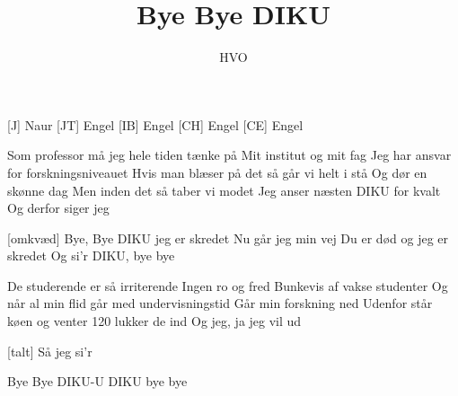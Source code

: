 \documentclass[a4paper,11pt]{article}
\title{Bye Bye DIKU}
\author{HVO}
\begin{document}
\maketitle

\begin{roles}
[J] Naur
[JT] Engel
[IB] Engel
[CH] Engel
[CE] Engel
\end{roles}

\begin{song}

 Som professor må jeg hele tiden tænke på
  Mit institut og mit fag
  Jeg har ansvar for forskningsniveauet
  Hvis man blæser på det så går vi helt i stå
  Og dør en skønne dag
  Men inden det så taber vi modet
  Jeg anser næsten DIKU for kvalt
  Og derfor siger jeg

[omkvæd] Bye, Bye DIKU jeg er skredet
  Nu går jeg min vej
  Du er død og jeg er skredet
  Og si'r DIKU, bye bye

 De studerende er så irriterende
  Ingen ro og fred
  Bunkevis af vakse studenter
  Og når al min flid går med undervisningstid
  Går min forskning ned
  Udenfor står køen og venter
  120 lukker de ind
  Og jeg, ja jeg vil ud

[talt] Så jeg si'r



 Bye Bye DIKU-U  DIKU bye bye

\end{song}
\end{document}
